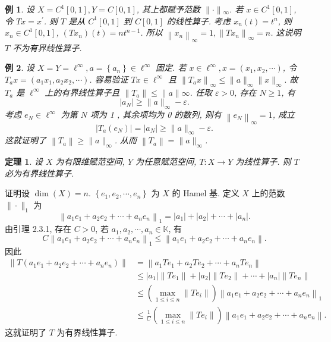 \documentclass[openany]{ctexbook}
\makeatletter
\theoremstyle{kaiti}
\newtheorem{theorem}{定理}[section]
\theoremstyle{normal}
\newtheorem{example}{例}[section]
\renewenvironment{proof}[1][\proofname]{\par
    \pushQED{\qed}%
    \normalfont \topsep6\p@\@plus6\p@\relax
    \trivlist
    \item\relax
    {\heiti #1}\hspace{2\labelsep}\ignorespaces
  }{%
    \popQED\endtrivlist\@endpefalse
  }
\makeatother
\begin{document}
\begin{example}
设 $X=C^1[0,1], Y=C[0,1]$, 其上都赋予范数 $\|\cdot\|{ }_{\infty}$. 若 $x \in C^1[0,1]$, 令 $T x=x^{\prime}$. 则 $T$ 是从 $C^1[0,1]$ 到 $C[0,1]$ 的线性算子. 考虑 $x_n(t)=t^n$, 则 $x_n \in C^1[0,1]$, $\left(T x_n\right)(t)=n t^{n-1}$. 所以 $\left\|x_n\right\|_{\infty}=1,\left\|T x_n\right\|_{\infty}=n$. 这说明 $T$ 不为有界线性算子.
\end{example}

\begin{example}
设 $X=Y=\ell^{\infty}, a=\left\{a_n\right\} \in \ell^{\infty}$ 固定. 若 $x \in \ell^{\infty}, x=\left(x_1, x_2, \cdots\right)$, 令 $T_{a} x=\left(a_1 x_1, a_2 x_2, \cdots\right)$. 容易验证 $T x \in \ell^{\infty}$ 且
$\left\|T_{a} x\right\|_{\infty} \leqslant\|a\|_{\infty}\|x\|_{\infty}.$
故 $T_{a}$ 是 $\ell^{\infty}$ 上的有界线性算子且 $\left\|T_{a}\right\| \leqslant\|a\| \infty$. 任取 $\varepsilon>0$, 存在 $N \geqslant 1$, 有
$$
\left|a_{N}\right| \geqslant\|a\|_{\infty}-\varepsilon.
$$
考虑 $e_{N} \in \ell^{\infty}$ 为第 $N$ 项为 1 , 其余项均为 0 的数列, 则有 $\left\|e_{N}\right\|_{\infty}=1$, 成立
$$
\left|T_{a}\left(e_{N}\right)\right|=\left|a_{N}\right| \geqslant\|a\|_{\infty}-\varepsilon.
$$
这就证明了 $\left\|T_{a}\right\| \geqslant\|a\|_{\infty}$. 从而 $\left\|T_{a}\right\|=\|a\|_{\infty}$.
\end{example}

\begin{theorem}
设 $X$ 为有限维赋范空间, $Y$ 为任意赋范空间, $T: X \rightarrow Y$ 为线性算子. 则 $T$ 必为有界线性算子.
\end{theorem}

\begin{proof}
  
证明设 $\operatorname{dim}(X)=n$. $\left\{e_1, e_2, \cdots, e_n\right\}$ 为 $X$ 的 Hamel 基. 定义 $X$ 上的范数 $\|\cdot\|_1$ 为
$$
\left\|a_1 e_1+a_2 e_2+\cdots+a_n e_n\right\|_1=\left|a_1\right|+\left|a_2\right|+\cdots+\left|a_n\right|.
$$
由引理 2.3.1, 存在 $C>0$, 若 $a_1, a_2, \cdots, a_n \in \mathbb{K}$, 有
$$
C\left\|a_1 e_1+a_2 e_2+\cdots+a_n e_n\right\|_1 \leqslant\left\|a_1 e_1+a_2 e_2+\cdots+a_n e_n\right\|.
$$
因此
$$
\begin{aligned}
\left\|T\left(a_1 e_1+a_2 e_2+\cdots+a_n e_n\right)\right\| &=\left\|a_1 T e_1+a_2 T e_2+\cdots+a_n T e_n\right\| \\
& \leqslant\left|a_1\right|\left\|T e_1\right\|+\left|a_2\right|\left\|T e_2\right\|+\cdots+\left|a_n\right|\left\|T e_n\right\| \\
& \leqslant\left(\max_{1 \leqslant i \leqslant n}\left\|T e_{i}\right\|\right)\left\|a_1 e_1+a_2 e_2+\cdots+a_n e_n\right\|_1 \\
& \leqslant \frac{1}{C}\left(\max_{1 \leqslant i \leqslant n}\left\|T e_{i}\right\|\right)\left\|a_1 e_1+a_2 e_2+\cdots+a_n e_n\right\|.
\end{aligned}
$$
这就证明了 $T$ 为有界线性算子.
\end{proof}
\end{document}
